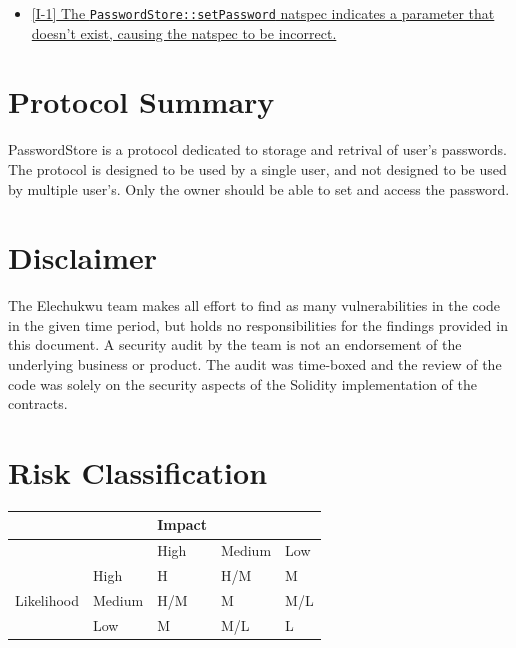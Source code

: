\documentclass[
  paper=a4,
  ,captions=tableheading
]{scrartcl}
\providecommand{\tightlist}{%
  \setlength{\itemsep}{0pt}\setlength{\parskip}{0pt}}
\begin{document}
\begin{itemize}
\begin{itemize}
    \begin{itemize}
    \tightlist
    \item
      \hyperref[i-1-the-passwordstoresetpassword-natspec-indicates-a-parameter-that-doesnt-exist-causing-the-natspec-to-be-incorrect]{{[}I-1{]}
      The \texttt{PasswordStore::setPassword} natspec indicates a
      parameter that doesn't exist, causing the natspec to be
      incorrect.}
    \end{itemize}
  \end{itemize}
\end{itemize}

\section{Protocol Summary}\label{protocol-summary}

PasswordStore is a protocol dedicated to storage and retrival of user's
passwords. The protocol is designed to be used by a single user, and not
designed to be used by multiple user's. Only the owner should be able to
set and access the password.

\section{Disclaimer}\label{disclaimer}

The Elechukwu team makes all effort to find as many vulnerabilities in
the code in the given time period, but holds no responsibilities for the
findings provided in this document. A security audit by the team is not
an endorsement of the underlying business or product. The audit was
time-boxed and the review of the code was solely on the security aspects
of the Solidity implementation of the contracts.

\section{Risk Classification}\label{risk-classification}

{\def\LTcaptype{none} %
\begin{longtable}[]{@{}lllll@{}}
\toprule\noalign{}
& & Impact & & \\
\midrule\noalign{}
\endhead
\bottomrule\noalign{}
\endlastfoot
& & High & Medium & Low \\
& High & H & H/M & M \\
Likelihood & Medium & H/M & M & M/L \\
& Low & M & M/L & L \\
\end{longtable}
}
\end{document}
